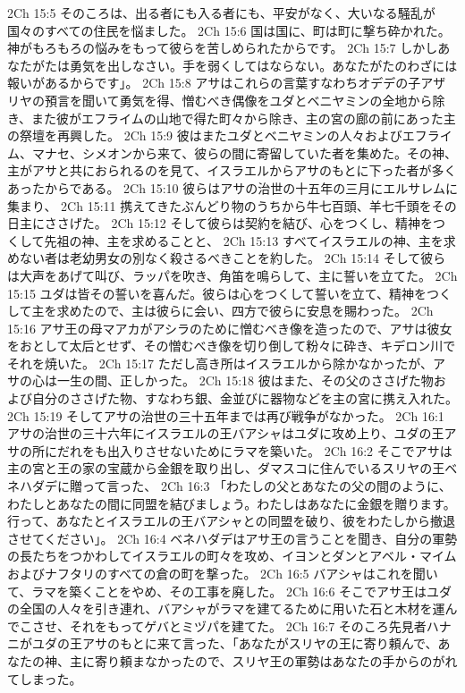 2Ch 15:5  そのころは、出る者にも入る者にも、平安がなく、大いなる騒乱が国々のすべての住民を悩ました。
2Ch 15:6  国は国に、町は町に撃ち砕かれた。神がもろもろの悩みをもって彼らを苦しめられたからです。
2Ch 15:7  しかしあなたがたは勇気を出しなさい。手を弱くしてはならない。あなたがたのわざには報いがあるからです」。
2Ch 15:8  アサはこれらの言葉すなわちオデデの子アザリヤの預言を聞いて勇気を得、憎むべき偶像をユダとベニヤミンの全地から除き、また彼がエフライムの山地で得た町々から除き、主の宮の廊の前にあった主の祭壇を再興した。
2Ch 15:9  彼はまたユダとベニヤミンの人々およびエフライム、マナセ、シメオンから来て、彼らの間に寄留していた者を集めた。その神、主がアサと共におられるのを見て、イスラエルからアサのもとに下った者が多くあったからである。
2Ch 15:10  彼らはアサの治世の十五年の三月にエルサレムに集まり、
2Ch 15:11  携えてきたぶんどり物のうちから牛七百頭、羊七千頭をその日主にささげた。
2Ch 15:12  そして彼らは契約を結び、心をつくし、精神をつくして先祖の神、主を求めることと、
2Ch 15:13  すべてイスラエルの神、主を求めない者は老幼男女の別なく殺さるべきことを約した。
2Ch 15:14  そして彼らは大声をあげて叫び、ラッパを吹き、角笛を鳴らして、主に誓いを立てた。
2Ch 15:15  ユダは皆その誓いを喜んだ。彼らは心をつくして誓いを立て、精神をつくして主を求めたので、主は彼らに会い、四方で彼らに安息を賜わった。
2Ch 15:16  アサ王の母マアカがアシラのために憎むべき像を造ったので、アサは彼女をおとして太后とせず、その憎むべき像を切り倒して粉々に砕き、キデロン川でそれを焼いた。
2Ch 15:17  ただし高き所はイスラエルから除かなかったが、アサの心は一生の間、正しかった。
2Ch 15:18  彼はまた、その父のささげた物および自分のささげた物、すなわち銀、金並びに器物などを主の宮に携え入れた。
2Ch 15:19  そしてアサの治世の三十五年までは再び戦争がなかった。
2Ch 16:1  アサの治世の三十六年にイスラエルの王バアシャはユダに攻め上り、ユダの王アサの所にだれをも出入りさせないためにラマを築いた。
2Ch 16:2  そこでアサは主の宮と王の家の宝蔵から金銀を取り出し、ダマスコに住んでいるスリヤの王ベネハダデに贈って言った、
2Ch 16:3  「わたしの父とあなたの父の間のように、わたしとあなたの間に同盟を結びましょう。わたしはあなたに金銀を贈ります。行って、あなたとイスラエルの王バアシャとの同盟を破り、彼をわたしから撤退させてください」。
2Ch 16:4  ベネハダデはアサ王の言うことを聞き、自分の軍勢の長たちをつかわしてイスラエルの町々を攻め、イヨンとダンとアベル・マイムおよびナフタリのすべての倉の町を撃った。
2Ch 16:5  バアシャはこれを聞いて、ラマを築くことをやめ、その工事を廃した。
2Ch 16:6  そこでアサ王はユダの全国の人々を引き連れ、バアシャがラマを建てるために用いた石と木材を運んでこさせ、それをもってゲバとミヅパを建てた。
2Ch 16:7  そのころ先見者ハナニがユダの王アサのもとに来て言った、「あなたがスリヤの王に寄り頼んで、あなたの神、主に寄り頼まなかったので、スリヤ王の軍勢はあなたの手からのがれてしまった。
